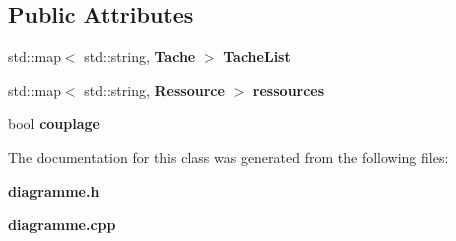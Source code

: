 \subsection*{Public Attributes}
\begin{DoxyCompactItemize}
\item 
std\-::map$<$ std\-::string, {\bf Tache} $>$ {\bfseries Tache\-List}\label{class_diagramme_a4c34785e515807602218c4dbaf093746}

\item 
std\-::map$<$ std\-::string, {\bf Ressource} $>$ {\bfseries ressources}\label{class_diagramme_aabfa2fbc5e06d84ed050d0ffd52a766b}

\item 
bool {\bfseries couplage}\label{class_diagramme_ac36fe3b7fbf917bfb1b456e0e9abaf6c}

\end{DoxyCompactItemize}


The documentation for this class was generated from the following files\-:\begin{DoxyCompactItemize}
\item 
{\bf diagramme.\-h}\item 
{\bf diagramme.\-cpp}\end{DoxyCompactItemize}
